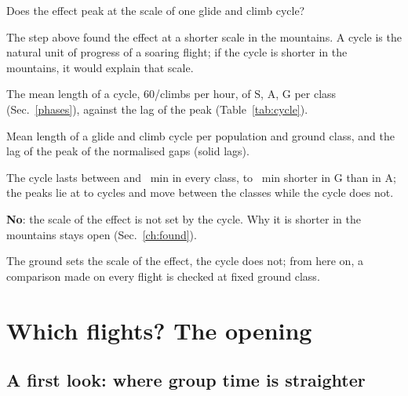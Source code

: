 \documentclass[10pt,a4paper]{article}
\newcommand{\G}{\mathrm{G}}
\newcommand{\A}{\mathrm{A}}
\newcommand{\Sl}{\mathrm{S}}
\newcommand{\Q}{\item[\textcolor{question}{\textbf{Q.}}]\color{question}}
\newcommand{\Res}{\item[\textcolor{answer}{\textbf{Result.}}]\color{black}}
\newcommand{\Home}{\item[\textcolor{answer}{\textbf{Take home.}}]\color{black}}
\newcommand{\Obs}{\item[\textcolor{answer}{\textbf{Observation.}}]\color{black}}
\newcommand{\Ded}{\item[\textcolor{answer}{\textbf{Deduction.}}]\color{black}}
\newcommand{\Why}{\item[\textcolor{black}{\textbf{Why.}}]\color{black}}
\newcommand{\Tool}{\item[\textcolor{black}{\textbf{Tool.}}]\color{black}}
\newenvironment{step}{\begin{description}[leftmargin=0pt, itemsep=7pt, topsep=8pt]}{\end{description}}
\begin{document}
\begin{step}
\Q Does the effect peak at the scale of one glide and climb cycle?
\Why The step above found the effect at a shorter scale in the mountains. A cycle is the natural unit of progress
  of a soaring flight; if the cycle is shorter in the mountains, it would explain that scale.
\Tool The mean length of a cycle, 60/climbs per hour, of $\Sl$, $\A$, $\G$ per class (Sec.~\ref{phases}), against
  the lag of the peak (Table~\ref{tab:cycle}).
\Res\mbox{}
  \begin{table}[H]
  \centering\footnotesize
  
  \caption{Mean length of a glide and climb cycle per population and ground class, and the lag of the peak of
  the normalised gaps (solid lags).}
  \label{tab:cycle}
  \end{table}
\Obs The cycle lasts between \PhCycleGHighMtn{} and \PhCycleAHighMtn~min in every class, \PhCycleShortMin{} to
  \PhCycleShortMax~min shorter in $\G$ than in $\A$; the peaks lie at \PhCycleRatioMin{} to \PhCycleRatioMax{} cycles and move between the classes while the cycle does not.
\Ded \textbf{No}: the scale of the effect is not set by the cycle. Why it is shorter in the mountains stays open
  (Sec.~\ref{ch:found}).
\Home The ground sets the scale of the effect, the cycle does not; from here on, a comparison made on every
  flight is checked at fixed ground class.
\end{step}

\section{Which flights? The opening}\label{ch:flights}

\subsection{A first look: where group time is straighter}\label{first-look}
\end{document}
